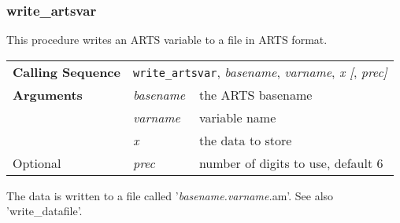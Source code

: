 \subsubsection{write\_artsvar}
This procedure writes an ARTS variable to a file in ARTS format.
\begin{center}
\begin{tabular}{|l|ll|}
  \hline
  \textbf{Calling Sequence} &
  \multicolumn{2}{l|}{\texttt{write\_artsvar}, %
                      \textit{basename}, \textit{varname}, %
                      \textit{x [}, \textit{prec]}}          \\
  \textbf{Arguments} & \textit{basename} & the ARTS basename \\
                     & \textit{varname}  & variable name     \\
                     & \textit{x}        & the data to store \\
  Optional           & \textit{prec}     &
                       number of digits to use, default 6    \\
  \hline
\end{tabular}
\end{center}
The data is written to a file called '\textit{basename.varname.}am'.
See also 'write\_datafile'. 


